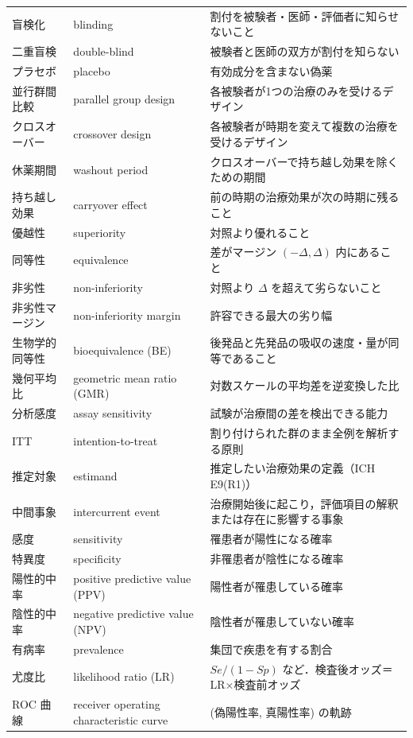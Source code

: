 \begin{center}
\begin{longtable}{@{}L{32mm}L{40mm}L{78mm}@{}}
盲検化 & blinding & 割付を被験者・医師・評価者に知らせないこと\\
二重盲検 & double-blind & 被験者と医師の双方が割付を知らない\\
プラセボ & placebo & 有効成分を含まない偽薬\\
並行群間比較 & parallel group design & 各被験者が1つの治療のみを受けるデザイン\\
クロスオーバー & crossover design & 各被験者が時期を変えて複数の治療を受けるデザイン\\
休薬期間 & washout period & クロスオーバーで持ち越し効果を除くための期間\\
持ち越し効果 & carryover effect & 前の時期の治療効果が次の時期に残ること\\
優越性 & superiority & 対照より優れること\\
同等性 & equivalence & 差がマージン $(-\Delta,\Delta)$ 内にあること\\
非劣性 & non-inferiority & 対照より $\Delta$ を超えて劣らないこと\\
非劣性マージン & non-inferiority margin & 許容できる最大の劣り幅\\
生物学的同等性 & bioequivalence (BE) & 後発品と先発品の吸収の速度・量が同等であること\\
幾何平均比 & geometric mean ratio (GMR) & 対数スケールの平均差を逆変換した比\\
分析感度 & assay sensitivity & 試験が治療間の差を検出できる能力\\
ITT & intention-to-treat & 割り付けられた群のまま全例を解析する原則\\
推定対象 & estimand & 推定したい治療効果の定義（ICH E9(R1)）\\
中間事象 & intercurrent event & 治療開始後に起こり，評価項目の解釈または存在に影響する事象\\
感度 & sensitivity & 罹患者が陽性になる確率\\
特異度 & specificity & 非罹患者が陰性になる確率\\
陽性的中率 & positive predictive value (PPV) & 陽性者が罹患している確率\\
陰性的中率 & negative predictive value (NPV) & 陰性者が罹患していない確率\\
有病率 & prevalence & 集団で疾患を有する割合\\
尤度比 & likelihood ratio (LR) & $Se/(1-Sp)$ など．検査後オッズ＝LR×検査前オッズ\\
ROC 曲線 & receiver operating characteristic curve & (偽陽性率, 真陽性率) の軌跡\\

\end{longtable}
\end{center}
